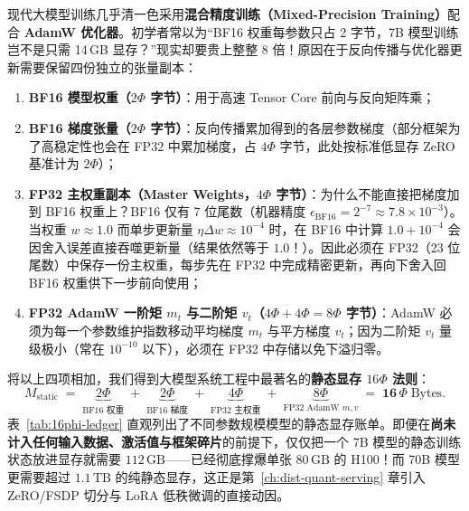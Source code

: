 现代大模型训练几乎清一色采用\textbf{混合精度训练（Mixed-Precision Training）}配合 \textbf{AdamW 优化器}。初学者常以为“BF16 权重每参数只占 2 字节，7B 模型训练岂不是只需 14\,GB 显存？”现实却要贵上整整 8 倍！原因在于反向传播与优化器更新需要保留四份独立的张量副本：
\begin{enumerate}
  \item \textbf{BF16 模型权重（$2\Phi$ 字节）}：用于高速 Tensor Core 前向与反向矩阵乘；
  \item \textbf{BF16 梯度张量（$2\Phi$ 字节）}：反向传播累加得到的各层参数梯度（部分框架为了高稳定性也会在 FP32 中累加梯度，占 $4\Phi$ 字节，此处按标准低显存 ZeRO 基准计为 $2\Phi$）；
  \item \textbf{FP32 主权重副本（Master Weights，$4\Phi$ 字节）}：为什么不能直接把梯度加到 BF16 权重上？BF16 仅有 7 位尾数（机器精度 $\epsilon_{\mathrm{BF16}} = 2^{-7} \approx 7.8\times 10^{-3}$）。当权重 $w \approx 1.0$ 而单步更新量 $\eta \Delta w \approx 10^{-4}$ 时，在 BF16 中计算 $1.0 + 10^{-4}$ 会因舍入误差直接吞噬更新量（结果依然等于 $1.0$！）。因此必须在 FP32（23 位尾数）中保存一份主权重，每步先在 FP32 中完成精密更新，再向下舍入回 BF16 权重供下一步前向使用；
  \item \textbf{FP32 AdamW 一阶矩 $m_t$ 与二阶矩 $v_t$（$4\Phi + 4\Phi = 8\Phi$ 字节）}：AdamW 必须为每一个参数维护指数移动平均梯度 $m_t$ 与平方梯度 $v_t$；因为二阶矩 $v_t$ 量级极小（常在 $10^{-10}$ 以下），必须在 FP32 中存储以免下溢归零。
\end{enumerate}

将以上四项相加，我们得到大模型系统工程中最著名的\textbf{静态显存 $16\Phi$ 法则}：
\begin{equation}
  M_{\mathrm{static}} \;=\; \underbrace{2\Phi}_{\text{BF16 权重}} \;+\; \underbrace{2\Phi}_{\text{BF16 梯度}} \;+\; \underbrace{4\Phi}_{\text{FP32 主权重}} \;+\; \underbrace{8\Phi}_{\text{FP32 AdamW } m,v} \;=\; \mathbf{16}\,\Phi\;\text{Bytes}.
  \label{eq:16phi-rule}
\end{equation}
表~\ref{tab:16phi-ledger} 直观列出了不同参数规模模型的静态显存账单。即便在\textbf{尚未计入任何输入数据、激活值与框架碎片}的前提下，仅仅把一个 7B 模型的静态训练状态放进显存就需要 $112\,\mathrm{GB}$——已经彻底撑爆单张 $80\,\mathrm{GB}$ 的 H100！而 70B 模型更需要超过 $1.1\,\mathrm{TB}$ 的纯静态显存，这正是第~\ref{ch:dist-quant-serving} 章引入 ZeRO/FSDP 切分与 LoRA 低秩微调的直接动因。

